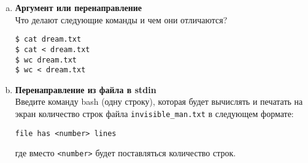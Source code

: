 \documentclass{article}
\begin{document}
\begin{enumerate}[a.]
\item \textbf{Аргумент или перенаправление}\\
Что делают следующие команды и чем они отличаются?
\begin{lstlisting}
$ cat dream.txt
$ cat < dream.txt
$ wc dream.txt
$ wc < dream.txt
\end{lstlisting}


\item \textbf{Перенаправление из файла в stdin}\\
Введите команду bash (одну строку), которая будет вычислять и печатать на экран количество строк файла \texttt{invisible\_man.txt} в следующем формате:
\begin{lstlisting}
file has <number> lines
\end{lstlisting}
где вместо \texttt{<number>} будет поставляться количество строк.

\end{enumerate}
\end{document}
